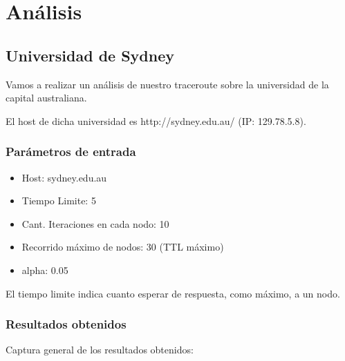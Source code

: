 \section{An\'alisis}

\subsection{Universidad de Sydney}
Vamos a realizar un an\'alisis de nuestro traceroute sobre la universidad de la capital australiana.\newline

El host de dicha universidad es http://sydney.edu.au/ (IP: 129.78.5.8).\\	

\subsubsection{Par\'ametros de entrada}
\begin{itemize}
\item Host: sydney.edu.au
\item Tiempo Limite: 5
\item Cant. Iteraciones en cada nodo: 10
\item Recorrido m\'aximo de nodos: 30 (TTL m\'aximo)
\item alpha: 0.05
\end{itemize}
El tiempo limite indica cuanto esperar de respuesta, como m\'aximo, a un nodo.\newline

\subsubsection{Resultados obtenidos}

Captura general de los resultados obtenidos: \newline


